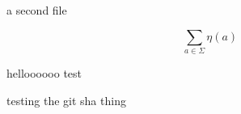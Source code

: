 \documentclass{article}
\begin{document}
a second file

\[
    \sum_{a\in\Sigma} \eta(a)
\]

helloooooo test

testing the git sha thing
\end{document}
